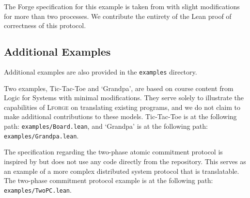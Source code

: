 The Forge specification for this example is taken from \cite{l4s} with slight modifications for more than two processes. We contribute the entirety of the Lean proof of correctness of this protocol. 

\subsection[]{Additional Examples}\label{appendix:additional-examples}
Additional examples are also provided in the \texttt{examples} directory. 

Two examples, Tic-Tac-Toe and `Grandpa', are based on course content from Logic for Systems \cite{l4s} with minimal modifications. They serve solely to illustrate the capabilities of \textsc{Lforge} on translating existing programs, and we do not claim to make additional contributions to these models. Tic-Tac-Toe is at the following path: \texttt{examples/Board.lean}, and `Grandpa' is at the following path: \texttt{examples/Grandpa.lean}. 

The specification regarding the two-phase atomic commitment protocol is inspired by \cite{distributedforge} but does not use any code directly from the repository. This serves as an example of a more complex distributed system protocol that is translatable. The two-phase commitment protocol example is at the following path: \texttt{examples/TwoPC.lean}. 